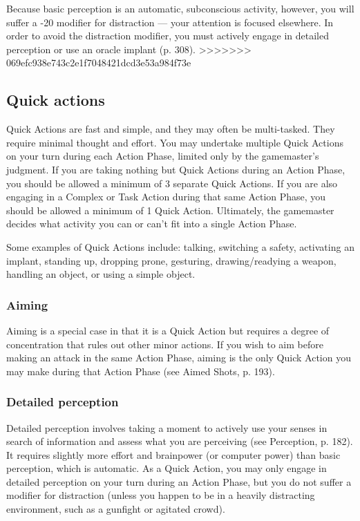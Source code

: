 Because basic perception is an automatic, subconscious activity, however, you will suffer a -20 modifier for distraction --- your attention is focused elsewhere. In order to avoid the distraction modifier, you must actively engage in detailed perception or use an oracle implant (p. 308). >>>>>>> 069efc938e743c2e1f7048421dcd3e53a984f73e 



\subsection{Quick actions} \label{sec:combat-quick-actions} 

Quick Actions are fast and simple, and they may often be multi-tasked. They require minimal thought and effort. You may undertake multiple Quick Actions on your turn during each Action Phase, limited only by the gamemaster’s judgment. If you are taking nothing but Quick Actions during an Action Phase, you should be allowed a minimum of 3 separate Quick Actions. If you are also engaging in a Complex or Task Action during that same Action Phase, you should be allowed a minimum of 1 Quick Action. Ultimately, the gamemaster decides what activity you can or can’t fit into a single Action Phase. 

Some examples of Quick Actions include: talking, switching a safety, activating an implant, standing up, dropping prone, gesturing, drawing/readying a weapon, handling an object, or using a simple object. 



\subsubsection{Aiming} 

Aiming is a special case in that it is a Quick Action but requires a degree of concentration that rules out other minor actions. If you wish to aim before making an attack in the same Action Phase, aiming is the only Quick Action you may make during that Action Phase (see Aimed Shots, p. 193). 

\subsubsection{Detailed perception} 

Detailed perception involves taking a moment to actively use your senses in search of information and assess what you are perceiving (see Perception, p. 182). It requires slightly more effort and brainpower (or computer power) than basic perception, which is automatic. As a Quick Action, you may only engage in detailed perception on your turn during an Action Phase, but you do not suffer a modifier for distraction (unless you happen to be in a heavily distracting environment, such as a gunfight or agitated crowd). 



